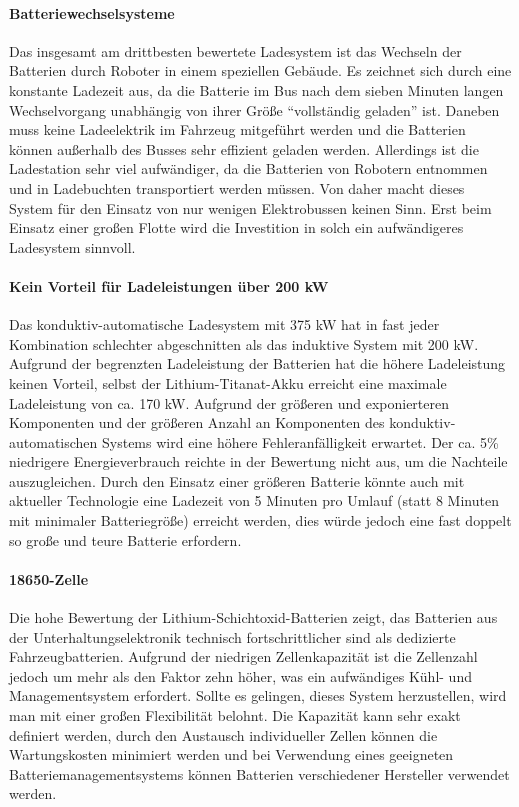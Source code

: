 \paragraph{Batteriewechselsysteme} Das insgesamt am drittbesten bewertete Ladesystem ist das Wechseln der Batterien durch Roboter in einem speziellen Gebäude. Es zeichnet sich durch eine konstante Ladezeit aus, da die Batterie im Bus nach dem sieben Minuten langen Wechselvorgang unabhängig von ihrer Größe "`vollständig geladen"' ist. Daneben muss keine Ladeelektrik im Fahrzeug mitgeführt werden und die Batterien können außerhalb des Busses sehr effizient geladen werden. Allerdings ist die Ladestation sehr viel aufwändiger, da die Batterien  von Robotern entnommen und in Ladebuchten transportiert werden müssen. Von daher macht dieses System für den Einsatz von nur wenigen Elektrobussen keinen Sinn. Erst beim Einsatz einer großen Flotte wird die Investition in solch ein aufwändigeres Ladesystem sinnvoll.

\paragraph{Kein Vorteil für Ladeleistungen über 200 kW} Das konduktiv-automatische Ladesystem mit 375 kW hat in fast jeder Kombination schlechter abgeschnitten als das induktive System mit 200 kW. Aufgrund der begrenzten Ladeleistung der Batterien hat die höhere Ladeleistung keinen Vorteil, selbst der Lithium-Titanat-Akku erreicht eine maximale Ladeleistung von ca. 170 kW. Aufgrund der größeren und exponierteren Komponenten und der größeren Anzahl an Komponenten des konduktiv-automatischen Systems wird eine höhere Fehleranfälligkeit erwartet. Der ca. 5\% niedrigere Energieverbrauch reichte in der Bewertung nicht aus, um die Nachteile auszugleichen. Durch den Einsatz einer größeren Batterie könnte auch mit aktueller Technologie eine Ladezeit von 5 Minuten pro Umlauf (statt 8 Minuten mit minimaler Batteriegröße) erreicht werden, dies würde jedoch eine fast doppelt so große und teure Batterie erfordern.

\paragraph{18650-Zelle} Die hohe Bewertung der Lithium-Schichtoxid-Batterien zeigt, das Batterien aus der Unterhaltungselektronik technisch fortschrittlicher sind als dedizierte Fahrzeugbatterien. Aufgrund der niedrigen Zellenkapazität ist die Zellenzahl jedoch um mehr als den Faktor zehn höher, was ein aufwändiges Kühl- und Managementsystem erfordert. Sollte es gelingen, dieses System herzustellen, wird man mit einer großen Flexibilität belohnt. Die Kapazität kann sehr exakt definiert werden, durch den Austausch individueller Zellen können die Wartungskosten minimiert werden und bei Verwendung eines geeigneten Batteriemanagementsystems können Batterien verschiedener Hersteller verwendet werden.

